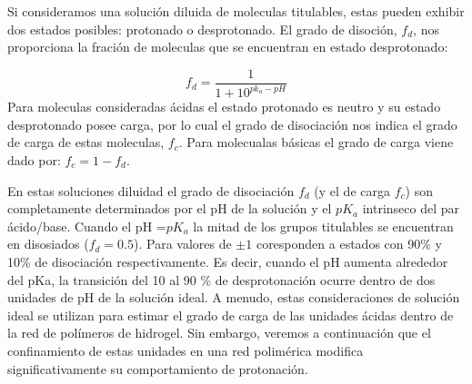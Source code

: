 Si consideramos una soluci\'on diluida de moleculas titulables, estas pueden exhibir dos estados posibles: protonado o desprotonado. El grado de disoción, $f_d$, nos proporciona la fraci\'on de moleculas que se encuentran en estado desprotonado:




\begin{equation}
    f_d = \frac{1}{1+10^{pk_a -pH}}
    \label{eq:diso}
\end{equation}
Para moleculas consideradas \'acidas el estado protonado es neutro y su estado desprotonado posee carga, por lo cual el grado de disociaci\'on nos indica el grado de carga de estas moleculas, $f_c$.
Para molecualas b\'asicas el grado de carga viene dado por: $f_c =1- f_d$.

En estas soluciones diluidad el grado de disociación $f_d$ (y el de carga $f_c$) son completamente determinados por el pH de la solución y el $pK_a$ intrinseco del par ácido/base. 
Cuando el pH =$pK_a$ la mitad de los grupos titulables se encuentran en disosiados ($f_d = 0.5$). Para valores de $\pm 1$ coresponden a estados con 90\% y 10\% de disociación respectivamente.
Es decir, cuando el pH aumenta alrededor del pKa, la transición del 10 al 90 \% de desprotonación ocurre dentro de dos unidades de pH de la solución ideal. A menudo, estas consideraciones de solución ideal se utilizan para estimar el grado de carga de las unidades ácidas dentro de la red de polímeros de hidrogel. Sin embargo, veremos a continuación que el confinamiento de estas unidades en una red polimérica modifica significativamente su comportamiento de protonación.

